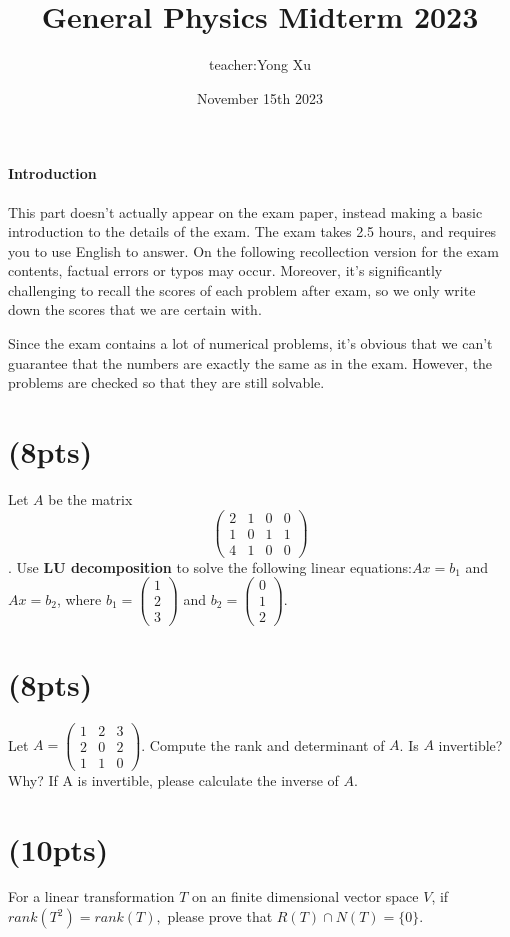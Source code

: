 \documentclass{article}
\title{General Physics Midterm 2023}
\author{teacher:Yong Xu}
\date{November 15th 2023}
\begin{document}
\maketitle
\paragraph{Introduction}
This part doesn't actually appear on the exam paper, instead making a basic introduction to the details of the exam. The exam takes 2.5 hours, and requires you to use English to answer. On the following recollection version for the exam contents, factual errors or typos may occur. Moreover, it's significantly challenging to recall the scores of each problem after exam, so we only write down the scores that we are certain with.

Since the exam contains a lot of numerical problems, it's obvious that we can't guarantee that the numbers are exactly the same as in the exam. However, the problems are checked so that they are still solvable.

\section{(8pts)}
Let $A$ be the matrix $$\begin{pmatrix} 2 & 1 & 0 & 0\\ 1 & 0 & 1 & 1 \\ 4 & 1 & 0 & 0 \end{pmatrix}$$ . Use \textbf{LU decomposition} to solve the following linear equations:$Ax=b_1$ and $Ax=b_2$, where $b_1=\begin{pmatrix}1\\2\\3\end{pmatrix}$ and $b_2=\begin{pmatrix}0\\1\\2\end{pmatrix}$.

\section{(8pts)}
Let $A=\begin{pmatrix}
    1&2&3\\2&0&2\\1&1&0
\end{pmatrix}$. Compute the rank and determinant of $A$. Is $A$ invertible? Why? If A is invertible, please calculate the inverse of $A$.
\section{(10pts)}
For a linear transformation $T$ on an finite dimensional vector space $V$, if $rank(T^2)=rank(T),$  please prove that $R(T)\cap N(T)=\{0\}.$
\end{document}
